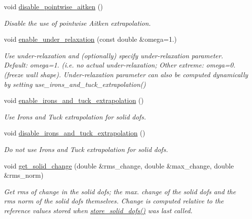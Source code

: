 \begin{DoxyCompactItemize}
void \hyperlink{classoomph_1_1SegregatableFSIProblem_a34c040b6fe4860ad44bc48ddf859e9fe}{disable\+\_\+pointwise\+\_\+aitken} ()
\begin{DoxyCompactList}\small\item\em Disable the use of pointwise Aitken extrapolation. \end{DoxyCompactList}\item 
void \hyperlink{classoomph_1_1SegregatableFSIProblem_a7ad67f163160a54024fb0bcd5fa531c3}{enable\+\_\+under\+\_\+relaxation} (const double \&omega=1.)
\begin{DoxyCompactList}\small\item\em Use under-\/relaxation and (optionally) specify under-\/relaxation parameter. Default\+: omega=1. (i.\+e. no actual under-\/relaxation; Other extreme\+: omega=0. (freeze wall shape). Under-\/relaxation parameter can also be computed dynamically by setting use\+\_\+irons\+\_\+and\+\_\+tuck\+\_\+extrapolation() \end{DoxyCompactList}\item 
void \hyperlink{classoomph_1_1SegregatableFSIProblem_a0cb257e933a9b3e0ce6d9f79a263851f}{enable\+\_\+irons\+\_\+and\+\_\+tuck\+\_\+extrapolation} ()
\begin{DoxyCompactList}\small\item\em Use Irons and Tuck extrapolation for solid dofs. \end{DoxyCompactList}\item 
void \hyperlink{classoomph_1_1SegregatableFSIProblem_a7f0bee5113993bf9b4ce4ab846f49c0a}{disable\+\_\+irons\+\_\+and\+\_\+tuck\+\_\+extrapolation} ()
\begin{DoxyCompactList}\small\item\em Do not use Irons and Tuck extrapolation for solid dofs. \end{DoxyCompactList}\item 
void \hyperlink{classoomph_1_1SegregatableFSIProblem_ad0792ffce87f26d8963846c472f13d08}{get\+\_\+solid\+\_\+change} (double \&rms\+\_\+change, double \&max\+\_\+change, double \&rms\+\_\+norm)
\begin{DoxyCompactList}\small\item\em Get rms of change in the solid dofs; the max. change of the solid dofs and the rms norm of the solid dofs themselves. Change is computed relative to the reference values stored when \hyperlink{classoomph_1_1SegregatableFSIProblem_af6a9e7b6f13b86bf86b65cfb7c4f966f}{store\+\_\+solid\+\_\+dofs()} was last called. \end{DoxyCompactList}\item 

\end{DoxyCompactItemize}
